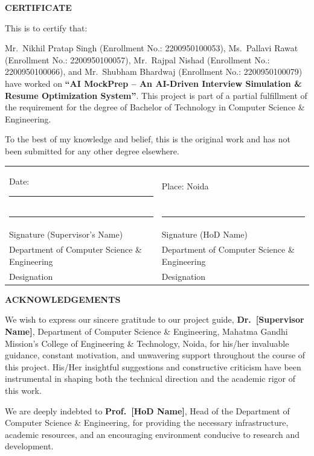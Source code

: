 \documentclass[12pt,a4paper,oneside]{report}
\newcommand{\projecttitle}{AI MockPrep -- An AI-Driven Interview Simulation \& Resume Optimization System}
\newcommand{\dept}{Computer Science \& Engineering}
\newcommand{\college}{Mahatma Gandhi Mission's College of Engineering \& Technology}
\begin{document}
\newpage
\begin{center}
{\Large\bfseries CERTIFICATE}
\end{center}
\vspace{1cm}

This is to certify that:

Mr.\ Nikhil Pratap Singh (Enrollment No.: 2200950100053), Ms.\ Pallavi Rawat (Enrollment No.: 2200950100057), Mr.\ Rajpal Nishad (Enrollment No.: 2200950100066), and Mr.\ Shubham Bhardwaj (Enrollment No.: 2200950100079) have worked on \textbf{``\projecttitle''}. This project is part of a partial fulfillment of the requirement for the degree of Bachelor of Technology in \dept.

\vspace{0.5cm}
To the best of my knowledge and belief, this is the original work and has not been submitted for any other degree elsewhere.

\vspace{2cm}
\noindent
\begin{tabular}{p{7cm}p{7cm}}
Date: \rule{3cm}{0.4pt} & Place: Noida \\[2cm]
\rule{5cm}{0.4pt} & \rule{5cm}{0.4pt} \\
Signature (Supervisor's Name) & Signature (HoD Name) \\
Department of \dept & Department of \dept \\
Designation & Designation \\
\end{tabular}

\newpage
\begin{center}
{\Large\bfseries ACKNOWLEDGEMENTS}
\end{center}
\vspace{1cm}

We wish to express our sincere gratitude to our project guide, \textbf{Dr.\ [Supervisor Name]}, Department of \dept, \college, Noida, for his/her invaluable guidance, constant motivation, and unwavering support throughout the course of this project. His/Her insightful suggestions and constructive criticism have been instrumental in shaping both the technical direction and the academic rigor of this work.

We are deeply indebted to \textbf{Prof.\ [HoD Name]}, Head of the Department of \dept, for providing the necessary infrastructure, academic resources, and an encouraging environment conducive to research and development.
\end{document}
